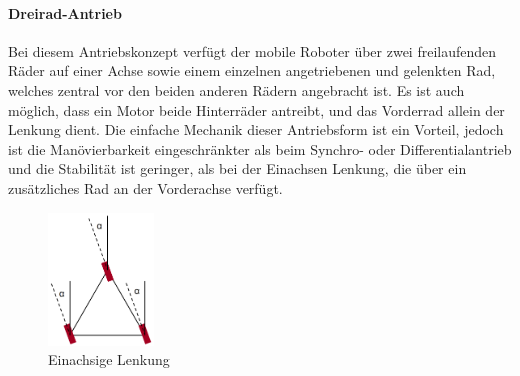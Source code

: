 \paragraph{Dreirad-Antrieb}
\color{process}
Bei diesem Antriebskonzept verfügt der mobile Roboter über zwei freilaufenden Räder auf einer Achse sowie einem einzelnen angetriebenen und gelenkten Rad, welches zentral vor den beiden anderen Rädern angebracht ist. Es ist auch möglich, dass ein Motor beide Hinterräder antreibt, und das Vorderrad allein der Lenkung dient.
\newline
Die einfache Mechanik dieser Antriebsform ist ein Vorteil, jedoch ist die Manövierbarkeit eingeschränkter als beim Synchro- oder Differentialantrieb und die Stabilität ist geringer, als bei der Einachsen Lenkung, die über ein zusätzliches Rad an der Vorderachse verfügt.
\begin{figure}
	\vspace{-0.8cm}
	\begin{center}
		\includegraphics[width=0.25\textwidth]{images/technische_grundlagen/Synchroantrieb.png}
	\end{center}
	\caption{Einachsige Lenkung}
	\label{fig:einachsenlenkung}
\end{figure}
